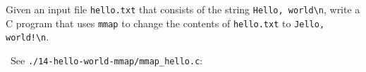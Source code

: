 \documentclass[12pt]{article}
\newenvironment{ex}[2][Exercise]{\begin{trivlist}
		\item[\hskip \labelsep {\bfseries #1}\hskip \labelsep {\bfseries #2.}]}{\end{trivlist}}
\newenvironment{sol}[1][Solution]{\begin{trivlist}
		\item[\hskip \labelsep {\bfseries #1:}]}{\end{trivlist}}
\begin{document}
\begin{ex}{9.14}
	Given an input file \texttt{hello.txt} that consists of the string \texttt{Hello, world\textbackslash n}, write a C program that uses \texttt{mmap} to change the contents of
	\texttt{hello.txt} to \texttt{Jello, world!\textbackslash n}.
\end{ex}


\begin{sol}
	\
	See \texttt{./14-hello-world-mmap/mmap\_hello.c}:
	
\end{sol}
\end{document}
